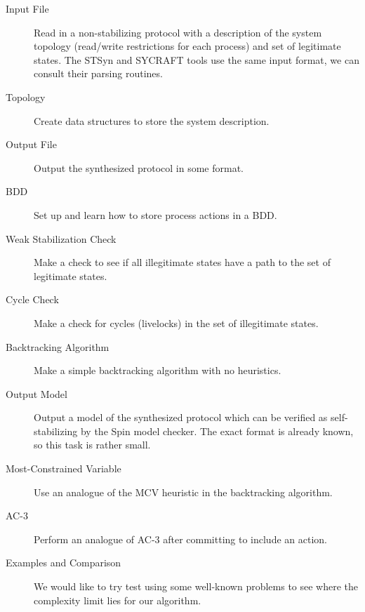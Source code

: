 
\begin{description}
 \item[Input File]
  Read in a non-stabilizing protocol with a description of the system topology (read/write restrictions for each process) and set of legitimate states.
  The STSyn and SYCRAFT tools use the same input format, we can consult their parsing routines.
 \item[Topology]
  Create data structures to store the system description.
 \item[Output File]
  Output the synthesized protocol in some format.
 \item[BDD]
  Set up and learn how to store process actions in a BDD.
 \item[Weak Stabilization Check]
  Make a check to see if all illegitimate states have a path to the set of legitimate states.
 \item[Cycle Check]
  Make a check for cycles (livelocks) in the set of illegitimate states.
 \item[Backtracking Algorithm]
  Make a simple backtracking algorithm with no heuristics.
 \item[Output Model]
  Output a model of the synthesized protocol which can be verified as self-stabilizing by the Spin model checker.
  The exact format is already known, so this task is rather small.
 \item[Most-Constrained Variable]
  Use an analogue of the MCV heuristic in the backtracking algorithm.
 \item[AC-3]
  Perform an analogue of AC-3 after committing to include an action.
 \item[Examples and Comparison]
  We would like to try test using some well-known problems to see where the complexity limit lies for our algorithm.
\end{description}

